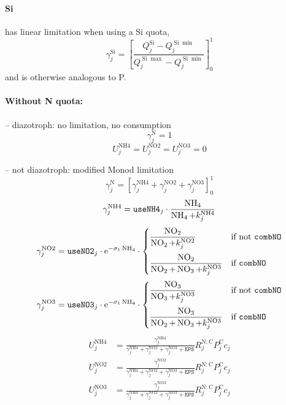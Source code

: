 \documentclass[11pt,letterpaper,english]{article}
\newcommand{\ee}{\mathrm{e}}
\DeclareMathOperator{\Si}{Si}
\DeclareMathOperator{\NH}{NH}
\DeclareMathOperator{\NO}{NO}
\DeclareMathOperator{\NHiv}{NH4}
\DeclareMathOperator{\NOii}{NO2}
\DeclareMathOperator{\NOiii}{NO3}
\newcommand{\N}{\mathrm{N}}
\newcommand{\C}{\mathrm{C}}
\newcommand{\X}{c}
\newcommand{\eps}{{\mathtt{EPS}}}
\begin{document}
\paragraph{Si} has linear limitation when using a Si quota,
\[
  \gamma^{\Si}_j = \left[ \frac{Q^{\Si}_j - Q^{\Si\min}_j}
                           {Q^{\Si\max}_j - Q^{\Si\min}_j}
                   \right]_0^1
\]
and is otherwise analogous to P.


\paragraph{Without N quota:}

-- diazotroph: no limitation, no consumption
\[
  \gamma^\N_j = 1
\]
\[
  U^{\NHiv}_j = U^{\NOii}_j = U^{\NOiii}_j = 0
\]

-- not diazotroph: modified Monod limitation
\[
  \gamma^\N_j = \left[ \gamma^{\NHiv}_j + \gamma^{\NOii}_j + \gamma^{\NOiii}_j \right]_0^1
\]
\[
  \gamma^{\NHiv}_j = \verb|useNH4|_j \cdot \frac{\NH_4}{\NH_4 + k^{\NHiv}_j}
\]
\[
  \gamma^{\NOii}_j = \verb|useNO2|_j \cdot
  \ee^{-\sigma_1 \NH_4} \cdot
  \begin{cases}
    \dfrac{\NO_2}{\NO_2 + k^{\NOii}_j} & \text{if not }\verb|combNO| \\[3ex]
    \dfrac{\NO_2}{\NO_2 + \NO_3 + k^{\NOiii}_j} & \text{if }\verb|combNO|
  \end{cases}
\]
\[
  \gamma^{\NOiii}_j = \verb|useNO3|_j \cdot
  \ee^{-\sigma_1 \NH_4} \cdot
  \begin{cases}
    \dfrac{\NO_3}{\NO_3 + k^{\NOiii}_j} & \text{if not }\verb|combNO| \\[3ex]
    \dfrac{\NO_3}{\NO_2 + \NO_3 + k^{\NOiii}_j} & \text{if }\verb|combNO|
  \end{cases}
\]
\begin{align}
  U^{\NHiv}_j &= \frac{\gamma^{\NHiv}_j}
                 {\gamma^{\NHiv}_j + \gamma^{\NOii}_j + \gamma^{\NOiii}_j + \eps}
                 R^{\N:\C}_j P^\C_j \X_j
  \label{eq:UNH4} \\
  U^{\NOii}_j &= \frac{\gamma^{\NOii}_j}
                 {\gamma^{\NHiv}_j + \gamma^{\NOii}_j + \gamma^{\NOiii}_j + \eps}
                 R^{\N:\C}_j P^\C_j \X_j
  \label{eq:UNO2} \\
  U^{\NOiii}_j &= \frac{\gamma^{\NOiii}_j}
                  {\gamma^{\NHiv}_j + \gamma^{\NOii}_j + \gamma^{\NOiii}_j + \eps}
                  R^{\N:\C}_j P^\C_j \X_j
  \label{eq:UNO3}
\end{align}
\end{document}
